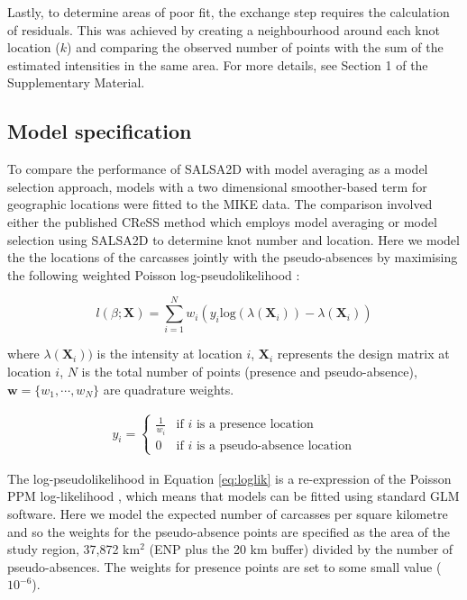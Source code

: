 \documentclass[letterpaper]{interact}
\begin{document}
Lastly, to determine areas of poor fit, the exchange step requires the calculation of residuals.  This was achieved by creating a neighbourhood around each knot location ($k$) and comparing the observed number of points with the sum of the estimated intensities in the same area. For more details, see Section 1 of the Supplementary Material. 


\newpage


\subsection{Model specification}\label{model-specification}

To compare the performance of SALSA2D with model averaging as a model selection approach, models with a two dimensional smoother-based term for geographic locations were fitted to the MIKE data. The comparison involved either the published CReSS method which employs model averaging \cite{scott2014} or model selection using SALSA2D to determine knot number and location. Here we model the the locations of the carcasses jointly with the pseudo-absences by maximising the following weighted Poisson log-pseudolikelihood \cite{Berman1992}:

\begin{equation}\label{eq:loglik}
    l(\beta;\textbf{X}) = \sum_{i=1}^{N}w_i(y_i \textrm{log}(\lambda(\textbf{X}_i)) - \lambda (\textbf{X}_i))
\end{equation}

where \(\lambda(\textbf{X}_i))\) is the intensity at location \(i\),  $\boldsymbol{X}_i$ represents the design matrix at location $i$, $N$ is the total number of points (presence and pseudo-absence), $\textbf{w} = \{w_1, \cdots, w_N\}$ are quadrature weights.

\begin{align*}
    y_i = \begin{cases}
      \frac{1}{w_i} & \text{if $i$ is a presence location}\\
      0 & \text{if $i$ is a pseudo-absence location}
    \end{cases} 
\end{align*}
 
 The log-pseudolikelihood in Equation \ref{eq:loglik} \cite{Berman1992} is a re-expression of the Poisson PPM log-likelihood \cite{cressie1993}, which means that models can be fitted using standard GLM software.  Here we model the expected number of carcasses per square kilometre and so the weights for the pseudo-absence points are specified as the area of the study region, 37,872 km$^2$ (ENP plus the 20 km buffer) divided by the number of pseudo-absences. The weights for presence points are set to some small value ($10^{-6}$).
\end{document}
